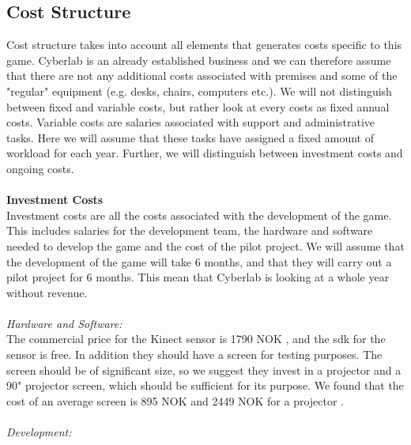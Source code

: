 \subsection{Cost Structure}
Cost structure takes into account all elements that generates costs specific to this game. Cyberlab is an already established business and we can therefore assume that there are not any additional costs associated with premises and some of the "regular" equipment (e.g. desks, chairs, computers etc.). We will not distinguish between fixed and variable costs, but rather look at every costs as fixed annual costs. Variable costs are salaries associated with support and administrative tasks. Here we will assume that these tasks have assigned a fixed amount of workload for each year. Further, we will distinguish between investment costs and ongoing costs.  \\ \\
\textbf{Investment Costs}\\
Investment costs are all the costs associated with the development of the game. This includes salaries for the development team, the hardware and software needed to develop the game and the cost of the pilot project. We will assume that the development of the game will take 6 months, and that they will carry out a pilot project for 6 months. This mean that Cyberlab is looking at a whole year without revenue.\\ \\
\emph{Hardware and Software:}\\
The commercial price for the Kinect sensor is 1790 NOK \cite{pricekinect}, and the \ac{sdk} for the sensor is free. In addition they should have a screen for testing purposes. The screen should be of significant size, so we suggest they invest in a projector and a 90" projector screen, which should be sufficient for its purpose. We found that the cost of an average screen is 895 NOK and 2449 NOK for a projector \cite{priceprojector}\cite{pricescreen}.\\ \\
\emph{Development:}\\
